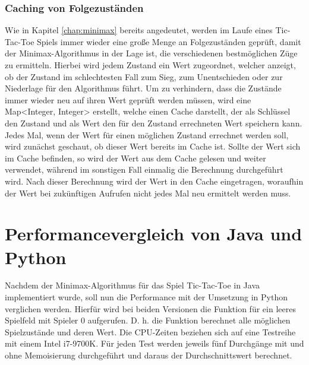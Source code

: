 \subsubsection{Caching von Folgezuständen}
Wie in Kapitel \ref{chap:minimax} bereits angedeutet, werden im Laufe eines Tic-Tac-Toe Spiels immer wieder eine große Menge an Folgezuständen geprüft, 
damit der Minimax-Algorithmus in der Lage ist, die verschiedenen bestmöglichen Züge zu ermitteln. Hierbei wird jedem Zustand ein Wert zugeordnet, welcher
anzeigt, ob der Zustand im schlechtesten Fall zum Sieg, zum Unentschieden oder zur Niederlage für den Algorithmus führt.
Um zu verhindern, dass die Zustände immer wieder neu auf ihren Wert geprüft werden müssen, wird eine Map<Integer, Integer> erstellt, welche einen
Cache darstellt, der als Schlüssel den Zustand und als Wert den für den Zustand errechneten Wert speichern kann. Jedes Mal, wenn der Wert für einen
möglichen Zustand errechnet werden soll, wird zunächst geschaut, ob dieser Wert bereits im Cache ist. Sollte der Wert sich im Cache befinden, so wird
der Wert aus dem Cache gelesen und weiter verwendet, während im sonstigen Fall einmalig die Berechnung durchgeführt wird. Nach dieser Berechnung wird der 
Wert in den Cache eingetragen, woraufhin der Wert bei zukünftigen Aufrufen nicht jedes Mal neu ermittelt werden muss.

\section{Performancevergleich von Java und Python}
\label{chap:performancevergleich}

Nachdem der Minimax-Algorithmus für das Spiel Tic-Tac-Toe in Java implementiert wurde, soll nun die 
Performance mit der Umsetzung in Python verglichen werden. Hierfür wird bei beiden Versionen die Funktion 
 für ein leeres Spielfeld mit Spieler 0 aufgerufen. D. h. die Funktion  berechnet 
alle möglichen Spielzustände und deren Wert. Die CPU-Zeiten beziehen sich auf eine Testreihe mit einem 
Intel i7-9700K. Für jeden Test werden jeweils fünf Durchgänge mit und ohne Memoisierung durchgeführt 
und daraus der Durchschnittswert berechnet.


